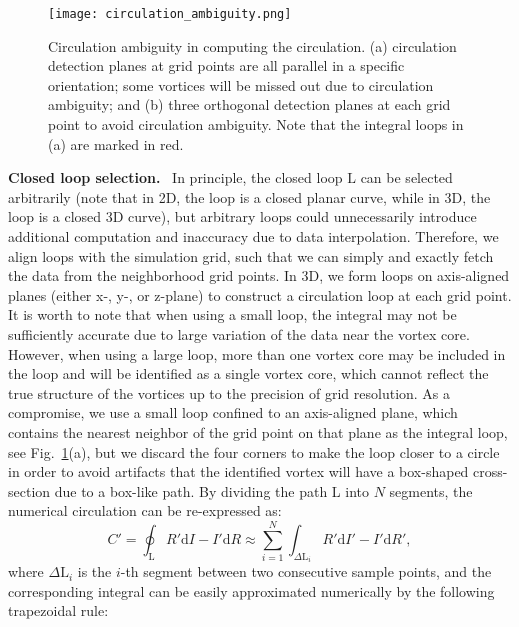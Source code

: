 \documentclass[10pt,journal,compsoc,twoside]{IEEEtran}
\begin{document}
	\begin{figure}
		\centering
		\texttt{[image: circulation\_ambiguity.png]}
		\caption{Circulation ambiguity in computing the circulation.
			(a) circulation detection planes at grid points are all parallel in a specific orientation; some vortices will be missed out due to circulation ambiguity; and
			(b) three orthogonal detection planes at each grid point to avoid circulation ambiguity.
			Note that the integral loops in (a) are marked in red.}
		\label{fig:circulation_ambiguity}
	\end{figure}
	
	\vspace{0.15cm}
	\noindent
	\textbf{Closed loop selection.} \
	In principle, the closed loop $\mathrm{L}$ can be selected arbitrarily (note that in 2D, the loop is a closed planar curve, while in 3D, the loop is a closed 3D curve), but arbitrary loops could unnecessarily introduce additional computation and inaccuracy due to data interpolation.
	Therefore, we align loops with the simulation grid, such that we can simply and exactly fetch the data from the neighborhood grid points.
	In 3D, we form loops on axis-aligned planes (either x-, y-, or z-plane) to construct a circulation loop at each grid point.
	It is worth to note that when using a small loop, the integral may not be sufficiently accurate due to large variation of the data near the vortex core.
	However, when using a large loop, more than one vortex core may be included in the loop and will be identified as a single vortex core, which cannot reflect the true structure of the vortices up to the precision of grid resolution.
	As a compromise, we use a small loop confined to an axis-aligned plane, which contains the nearest neighbor of the grid point on that plane as the integral loop, see Fig.~\ref{fig:circulation_ambiguity}(a), but we discard the four corners to make the loop closer to a circle in order to avoid artifacts that the identified vortex will have a box-shaped cross-section due to a box-like path.
	By dividing the path L into $N$ segments, the numerical circulation can be re-expressed as:
	\begin{equation} \label{numeric_circ}
		C' = \oint_\mathrm{L} \mathrm{\mathit{R}' d \mathit{I} - \mathit{I}' d \mathit{R}} \approx \sum_{i=1}^N \int_{\Delta \mathrm{L}_i} \mathit{R' \mathrm{d}I' - I' \mathrm{d}R'},
	\end{equation}
	where $\Delta \mathrm{L}_i$ is the $i$-th segment between two consecutive sample points,
	and the corresponding integral can be easily approximated numerically by the following trapezoidal rule:
\end{document}
